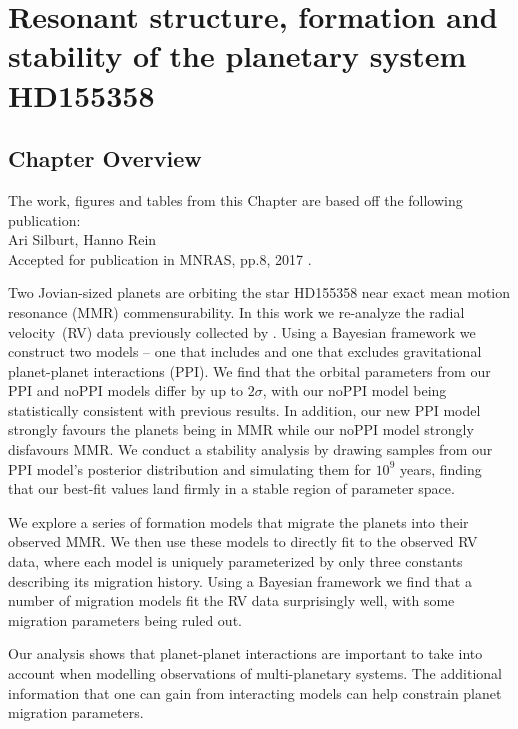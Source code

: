 \chapter[Analysis of HD155358]{Resonant structure, formation and stability of the planetary system HD155358}
\label{chap:HD155358}

\section{Chapter Overview}
	\begin{center}
	\begin{minipage}[c]{4.75in}
	The work, figures and tables from this Chapter are based off the following publication:\\
	
	Ari Silburt, Hanno Rein\\
	Accepted for publication in MNRAS, pp.8, 2017 \citep{Silburt2017}.
	\vspace{2em}
	\end{minipage}
	\end{center}
	
Two Jovian-sized planets are orbiting the star HD155358 near exact mean motion resonance (MMR) commensurability. 
In this work we re-analyze the radial velocity~(RV) data previously collected by \citet{Robertson2012}.
Using a Bayesian framework we construct two models -- one that includes and one that excludes gravitational planet-planet interactions (PPI).
We find that the orbital parameters from our PPI and noPPI models differ by up to $2\sigma$, with our noPPI model being statistically consistent with previous results.
In addition, our new PPI model strongly favours the planets being in MMR while our noPPI model strongly disfavours MMR.
We conduct a stability analysis by drawing samples from our PPI model's posterior distribution and simulating them for $10^9$ years, finding that our best-fit values land firmly in a stable region of parameter space.

We explore a series of formation models that migrate the planets into their observed MMR.
We then use these models to directly fit to the observed RV data, where each model is uniquely parameterized by only three constants describing its migration history.
Using a Bayesian framework we find that a number of migration models fit the RV data surprisingly well, with some migration parameters being ruled out.

Our analysis shows that planet-planet interactions are important to take into account when modelling observations of multi-planetary systems.
The additional information that one can gain from interacting models can help constrain planet migration parameters.

